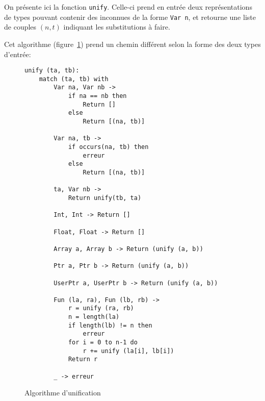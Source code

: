 On présente ici la fonction \texttt{unify}. Celle-ci prend en entrée deux
représentations de types pouvant contenir des inconnues de la forme \texttt{Var
n}, et retourne une liste de couples $(n, t)$ indiquant les substitutions à
faire.

Cet algorithme (figure~\ref{fig:algo-unif}) prend un chemin différent selon la
forme des deux types d'entrée:

\begin{figure}[h]%
\begin{Verbatim}
unify (ta, tb):
    match (ta, tb) with
        Var na, Var nb ->
            if na == nb then
                Return []
            else
                Return [(na, tb)]

        Var na, tb ->
            if occurs(na, tb) then
                erreur
            else
                Return [(na, tb)]

        ta, Var nb ->
            Return unify(tb, ta)

        Int, Int -> Return []

        Float, Float -> Return []

        Array a, Array b -> Return (unify (a, b))

        Ptr a, Ptr b -> Return (unify (a, b))

        UserPtr a, UserPtr b -> Return (unify (a, b))

        Fun (la, ra), Fun (lb, rb) ->
            r = unify (ra, rb)
            n = length(la)
            if length(lb) != n then
                erreur
            for i = 0 to n-1 do
                r += unify (la[i], lb[i])
            Return r

        _ -> erreur

\end{Verbatim}

\caption{Algorithme d'unification}
\label{fig:algo-unif}
\end{figure}%


